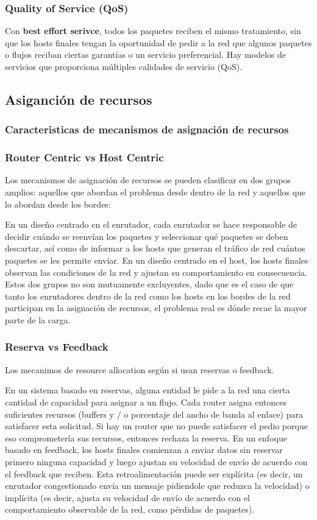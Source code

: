 \subsubsection*{Quality of Service (QoS)} 
Con \textbf{best effort serivce}, todos los paquetes reciben el mismo tratamiento, sin que los hosts finales tengan la oportunidad de pedir a la red que algunos paquetes o flujos reciban ciertas garantías o un servicio preferencial. Hay modelos de servicios que proporciona múltiples calidades de servicio (QoS). 


\subsection{Asiganción de recursos}
\subsubsection{Caracteristicas de mecanismos de asignación de recursos}
\subsubsection*{Router Centric vs Host Centric}
Los mecanismos de asignación de recursos se pueden clasificar en dos grupos amplios: aquellos que abordan el problema desde dentro de la red y aquellos que lo abordan desde los bordes: 

En un diseño centrado en el enrutador, cada enrutador se hace responsable de decidir cuándo se reenvían los paquetes y seleccionar qué paquetes se deben descartar, así como de informar a los hosts que generan el tráfico de red cuántos paquetes se les permite enviar. En un diseño centrado en el host, los hosts finales observan las condiciones de la red y ajustan su comportamiento en consecuencia. Estos dos grupos no son mutuamente excluyentes, dado que es el caso de que tanto los enrutadores dentro de la red como los hosts en los bordes de la red participan en la asignación de recursos, el problema real es dónde recae la mayor parte de la carga.

\subsubsection*{Reserva vs Feedback}
Los mecanimos de resource allocation según si usan reservas o feedback.

En un sistema basado en reservas, alguna entidad le pide a la red una cierta cantidad de capacidad para asignar a un flujo. Cada router asigna entonces suficientes recursos (buffers y / o porcentaje del ancho de banda al enlace) para satisfacer esta solicitud. Si hay un router que no puede satisfacer el pedio porque eso comprometería sus recursos, entonces rechaza la reserva. En un enfoque basado en feedback, los hosts finales comienzan a enviar datos sin reservar primero ninguna capacidad y luego ajustan su velocidad de envío de acuerdo con el feedback que reciben. Esta retroalimentación puede ser explícita (es decir, un enrutador congestionado envía un mensaje pidiendole que reduzca la velocidad) o implícita (es decir, ajusta su velocidad de envío de acuerdo con el comportamiento observable de la red, como pérdidas de paquetes).

